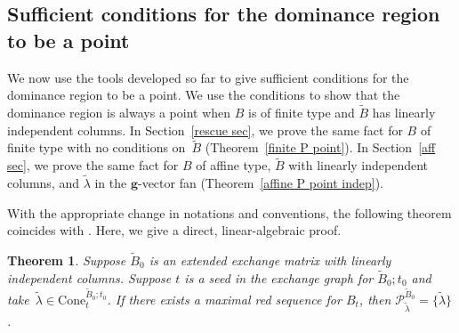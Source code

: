 \documentclass[10pt]{article}
\newtheorem{theorem}[proposition]{Theorem}
\theoremstyle{definition}
\theoremstyle{remark}
\numberwithin{equation}{section}
\newcommand{\set}[1]{{\lbrace #1 \rbrace}}
\newcommand{\0}{{\mathbf{0}}}
\newcommand{\Cone}{\mathrm{Cone}}
\newcommand{\g}{\mathbf{g}}
\newcommand{\tB}{{\widetilde{B}}}
\renewcommand{\P}{\mathcal{P}}
\begin{document}
\subsection{Sufficient conditions for the dominance region to be a point}\label{point sec}  
We now use the tools developed so far to give sufficient conditions for the dominance region to be a point.
We use the conditions to show that the dominance region is always a point when $B$ is of finite type and $\tB$ has linearly independent columns.
In Section~\ref{rescue sec}, we prove the same fact for $B$ of finite type with no conditions on~$\tB$ (Theorem~\ref{finite P point}).
In Section~\ref{aff sec}, we prove the same fact for $B$ of affine type, $\tB$ with linearly independent columns, and $\tilde\lambda$ in the $\g$-vector fan (Theorem~\ref{affine P point indep}). 

With the appropriate change in notations and conventions, the following theorem coincides with \cite[Lemma 3.4.12]{FanQin}.
Here, we give a direct, linear-algebraic proof. 

\begin{theorem}\label{P point}  
Suppose $\tB_0$ is an extended exchange matrix with linearly independent columns.
Suppose $t$ is a seed in the exchange graph for $\tB_0;t_0$ and take~$\tilde\lambda\in\Cone^{\tB_0;t_0}_t$.
If there exists a maximal red sequence for $B_t$, then $\P^{\tB_0}_{\tilde\lambda}=\set{\tilde\lambda}$.
\end{theorem}
\end{document}
